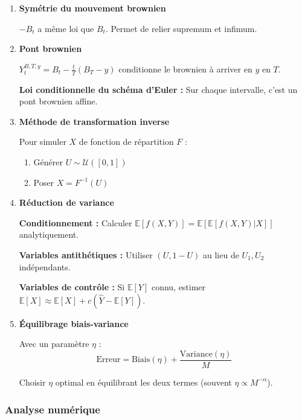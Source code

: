 \documentclass[12pt,a4paper]{article}
\theoremstyle{definition}
\theoremstyle{remark}
\newcommand{\E}{\mathbb{E}}
\begin{document}
\begin{enumerate}
\item \textbf{Symétrie du mouvement brownien}

$-B_t$ a même loi que $B_t$. Permet de relier supremum et infimum.

\item \textbf{Pont brownien}

$Y_t^{B,T,y} = B_t - \frac{t}{T}(B_T - y)$ conditionne le brownien à arriver en $y$ en $T$.

\textbf{Loi conditionnelle du schéma d'Euler :} Sur chaque intervalle, c'est un pont brownien affine.

\item \textbf{Méthode de transformation inverse}

Pour simuler $X$ de fonction de répartition $F$ :
\begin{enumerate}
\item Générer $U \sim \mathcal{U}([0,1])$
\item Poser $X = F^{-1}(U)$
\end{enumerate}

\item \textbf{Réduction de variance}

\textbf{Conditionnement :} Calculer $\E[f(X,Y)] = \E[\E[f(X,Y)|X]]$ analytiquement.

\textbf{Variables antithétiques :} Utiliser $(U, 1-U)$ au lieu de $U_1, U_2$ indépendants.

\textbf{Variables de contrôle :} Si $\E[Y]$ connu, estimer $\E[X] \approx \E[X] + c(\hat{Y} - \E[Y])$.

\item \textbf{Équilibrage biais-variance}

Avec un paramètre $\eta$ :
\[
\text{Erreur} = \text{Biais}(\eta) + \frac{\text{Variance}(\eta)}{M}
\]

Choisir $\eta$ optimal en équilibrant les deux termes (souvent $\eta \propto M^{-\alpha}$).
\end{enumerate}

\subsubsection{Analyse numérique}
\end{document}
